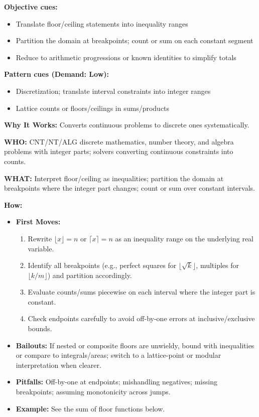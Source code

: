 \documentclass[12pt]{article}
\begin{document}
\textbf{Objective cues:}
\begin{itemize}
    \item Translate floor/ceiling statements into inequality ranges
    \item Partition the domain at breakpoints; count or sum on each constant segment
    \item Reduce to arithmetic progressions or known identities to simplify totals
\end{itemize}

\textbf{Pattern cues (Demand: Low):}
\begin{itemize}
    \item Discretization; translate interval constraints into integer ranges
    \item Lattice counts or floors/ceilings in sums/products
\end{itemize}

\textbf{Why It Works:} Converts continuous problems to discrete ones systematically.

\textbf{WHO:} CNT/NT/ALG discrete mathematics, number theory, and algebra problems with integer parts; solvers converting continuous constraints into counts.

\textbf{WHAT:} Interpret floor/ceiling as inequalities; partition the domain at breakpoints where the integer part changes; count or sum over constant intervals.


\textbf{How:}
\begin{itemize}
    \item \textbf{First Moves:}
    \begin{enumerate}[nosep]
        \item Rewrite $\lfloor x \rfloor = n$ or $\lceil x \rceil = n$ as an inequality range on the underlying real variable.
        \item Identify all breakpoints (e.g., perfect squares for $\lfloor\sqrt{k}\rfloor$, multiples for $\lfloor k/m \rfloor$) and partition accordingly.
        \item Evaluate counts/sums piecewise on each interval where the integer part is constant.
        \item Check endpoints carefully to avoid off-by-one errors at inclusive/exclusive bounds.
    \end{enumerate}
    \item \textbf{Bailouts:} If nested or composite floors are unwieldy, bound with inequalities or compare to integrals/areas; switch to a lattice-point or modular interpretation when clearer.
    \item \textbf{Pitfalls:} Off-by-one at endpoints; mishandling negatives; missing breakpoints; assuming monotonicity across jumps.
    \item \textbf{Example:} See the sum of floor functions below.
\end{itemize}
\end{document}
